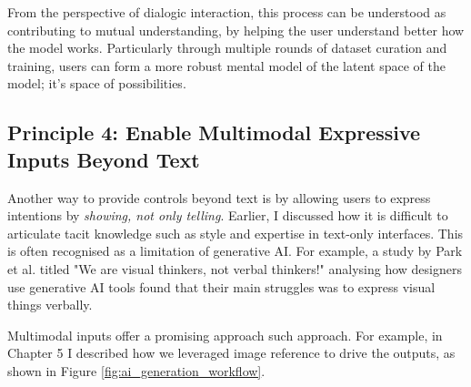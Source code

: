From the perspective of dialogic interaction, this process can be understood as contributing to mutual understanding, by helping the user understand better how the model works. Particularly through multiple rounds of dataset curation and training, users can form a more robust mental model of the latent space of the model; it's space of possibilities.

\subsection{Principle 4: Enable Multimodal Expressive Inputs Beyond Text}

Another way to provide controls beyond text is by allowing users to express intentions by \textit{showing, not only telling}. Earlier, I discussed how it is difficult to articulate tacit knowledge such as style and expertise in text-only interfaces. This is often recognised as a limitation of generative AI. For example, a study by Park et al. \cite{Park2024-gw} titled "We are visual thinkers, not verbal thinkers!" analysing how designers use generative AI tools found that their main struggles was to express visual things verbally.

Multimodal inputs offer a promising approach such approach. For example, in Chapter 5 I described how we leveraged image reference to drive the outputs, as shown in Figure  \ref{fig:ai_generation_workflow}.

